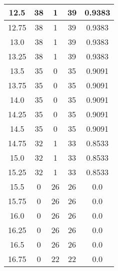 \documentclass[letterpaper, 12pt]{article}
\begin{document}
\begin{longtable}{|c|c|c|c|c|}
12.5 & 38 & 1 & 39 & 0.9383 \\
\hline
12.75 & 38 & 1 & 39 & 0.9383 \\
\hline
13.0 & 38 & 1 & 39 & 0.9383 \\
\hline
13.25 & 38 & 1 & 39 & 0.9383 \\
\hline
13.5 & 35 & 0 & 35 & 0.9091 \\
\hline
13.75 & 35 & 0 & 35 & 0.9091 \\
\hline
14.0 & 35 & 0 & 35 & 0.9091 \\
\hline
14.25 & 35 & 0 & 35 & 0.9091 \\
\hline
14.5 & 35 & 0 & 35 & 0.9091 \\
\hline
14.75 & 32 & 1 & 33 & 0.8533 \\
\hline
15.0 & 32 & 1 & 33 & 0.8533 \\
\hline
15.25 & 32 & 1 & 33 & 0.8533 \\
\hline
15.5 & 0 & 26 & 26 & 0.0 \\
\hline
15.75 & 0 & 26 & 26 & 0.0 \\
\hline
16.0 & 0 & 26 & 26 & 0.0 \\
\hline
16.25 & 0 & 26 & 26 & 0.0 \\
\hline
16.5 & 0 & 26 & 26 & 0.0 \\
\hline
16.75 & 0 & 22 & 22 & 0.0 \\
\hline
\end{longtable}
\end{document}
